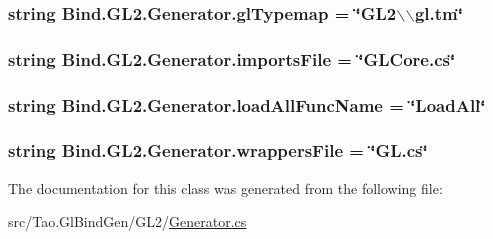 \label{class_bind_1_1_g_l2_1_1_generator_a445927d580862e53ace5e70040bf6761}
\hypertarget{class_bind_1_1_g_l2_1_1_generator_ab9d850d5a7f454f18e1493b9532a9f18}{
\subsubsection[{glTypemap}]{\setlength{\rightskip}{0pt plus 5cm}string {\bf Bind.GL2.Generator.glTypemap} = \char`\"{}GL2$\backslash$$\backslash$gl.tm\char`\"{}}}
\label{class_bind_1_1_g_l2_1_1_generator_ab9d850d5a7f454f18e1493b9532a9f18}
\hypertarget{class_bind_1_1_g_l2_1_1_generator_aef567e60258164fbe861f85224516e58}{
\subsubsection[{importsFile}]{\setlength{\rightskip}{0pt plus 5cm}string {\bf Bind.GL2.Generator.importsFile} = \char`\"{}GLCore.cs\char`\"{}}}
\label{class_bind_1_1_g_l2_1_1_generator_aef567e60258164fbe861f85224516e58}
\hypertarget{class_bind_1_1_g_l2_1_1_generator_a5a1e4f3c93ada38a8ca45945c8f30e93}{
\subsubsection[{loadAllFuncName}]{\setlength{\rightskip}{0pt plus 5cm}string {\bf Bind.GL2.Generator.loadAllFuncName} = \char`\"{}LoadAll\char`\"{}}}
\label{class_bind_1_1_g_l2_1_1_generator_a5a1e4f3c93ada38a8ca45945c8f30e93}
\hypertarget{class_bind_1_1_g_l2_1_1_generator_a0bda98500ebdcf4e33497cfee0bedaea}{
\subsubsection[{wrappersFile}]{\setlength{\rightskip}{0pt plus 5cm}string {\bf Bind.GL2.Generator.wrappersFile} = \char`\"{}GL.cs\char`\"{}}}
\label{class_bind_1_1_g_l2_1_1_generator_a0bda98500ebdcf4e33497cfee0bedaea}


The documentation for this class was generated from the following file:\begin{DoxyCompactItemize}
\item 
src/Tao.GlBindGen/GL2/\hyperlink{_g_l2_2_generator_8cs}{Generator.cs}\end{DoxyCompactItemize}

